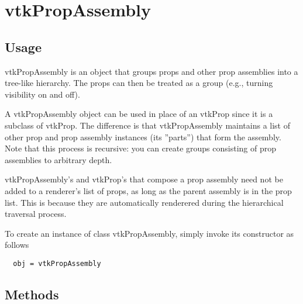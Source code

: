 \section{vtkPropAssembly}

\subsection{Usage}

 vtkPropAssembly is an object that groups props and other prop assemblies
 into a tree-like hierarchy. The props can then be treated as a group
 (e.g., turning visibility on and off).

 A vtkPropAssembly object can be used in place of an vtkProp since it is a
 subclass of vtkProp. The difference is that vtkPropAssembly maintains a
 list of other prop and prop assembly instances (its ''parts'') that form the
 assembly. Note that this process is recursive: you can create groups 
 consisting of prop assemblies to arbitrary depth.

 vtkPropAssembly's and vtkProp's that compose a prop assembly need not be
 added to a renderer's list of props, as long as the parent assembly is in
 the prop list. This is because they are automatically renderered during
 the hierarchical traversal process.

To create an instance of class vtkPropAssembly, simply
invoke its constructor as follows
\begin{verbatim}
  obj = vtkPropAssembly
\end{verbatim}
\subsection{Methods}

